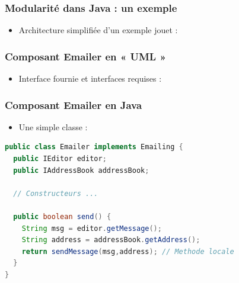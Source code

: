 \documentclass{beamer}
\begin{document}
\begin{frame}
  \frametitle{Modularité dans Java : un exemple}
  \begin{itemize}
  \item Architecture simplifiée d'un exemple jouet :
    \vspace{5cm}
  \end{itemize}
\end{frame}

\begin{frame}
  \frametitle{Composant Emailer en « UML »}
  \begin{itemize}
  \item Interface fournie et interfaces requises :
    \vspace{5cm}
  \end{itemize}
\end{frame}

\begin{frame}[fragile]
  \frametitle{Composant Emailer en Java}
  \begin{itemize}
  \item Une simple classe :
    \end{itemize}
\begin{lstlisting}[language=Java]
public class Emailer implements Emailing {
  public IEditor editor;
  public IAddressBook addressBook;
  
  // Constructeurs ...

  public boolean send() {
    String msg = editor.getMessage();
    String address = addressBook.getAddress();
    return sendMessage(msg,address); // Methode locale
  }
}
\end{lstlisting}
\end{frame}
\end{document}
